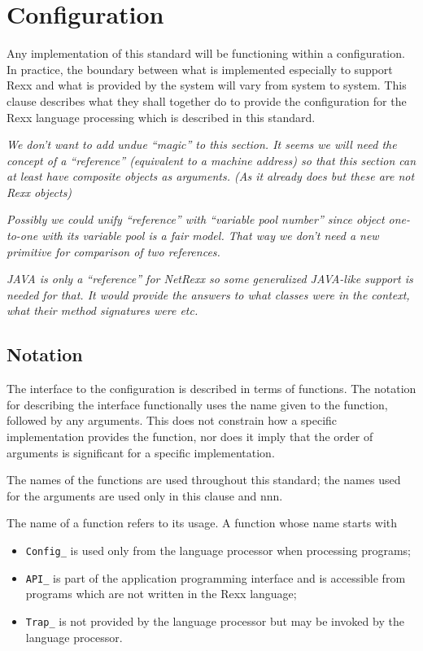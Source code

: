 \chapter{Configuration}\label{configuration}

Any implementation of this standard will be functioning within a
configuration. In practice, the boundary between what is implemented
especially to support Rexx and what is provided by the system will vary
from system to system. This clause describes what they shall together do
to provide the configuration for the Rexx language processing which is
described in this standard.

\emph{We don't want to add undue ``magic'' to this section. It seems we
will need the concept of a ``reference'' (equivalent to a machine
address) so that this section can at least have composite objects as
arguments. (As it already does but these are not Rexx objects)}

\emph{Possibly we could unify ``reference'' with ``variable pool
number'' since object one-to-one with its variable pool is a fair model.
That way we don't need a new primitive for comparison of two
references.}

\emph{JAVA is only a ``reference'' for NetRexx so some generalized
JAVA-like support is needed for that. It would provide the answers to
what classes were in the context, what their method signatures were
etc.}

\section{Notation}\label{notation}

The interface to the configuration is described in terms of functions.
The notation for describing the interface functionally uses the name
given to the function, followed by any arguments. This does not
constrain how a specific implementation provides the function, nor does
it imply that the order of arguments is significant for a specific
implementation.

The names of the functions are used throughout this standard; the names
used for the arguments are used only in this clause and nnn.

The name of a function refers to its usage. A function whose name starts
with

\begin{itemize}
\item
  \texttt{Config\_} is used only from the language processor when
  processing programs;
\item
  \texttt{API\_} is part of the application programming interface and is
  accessible from programs which are not written in the Rexx language;
\item
  \texttt{Trap\_} is not provided by the language processor but may be
  invoked by the language processor.
\end{itemize}

